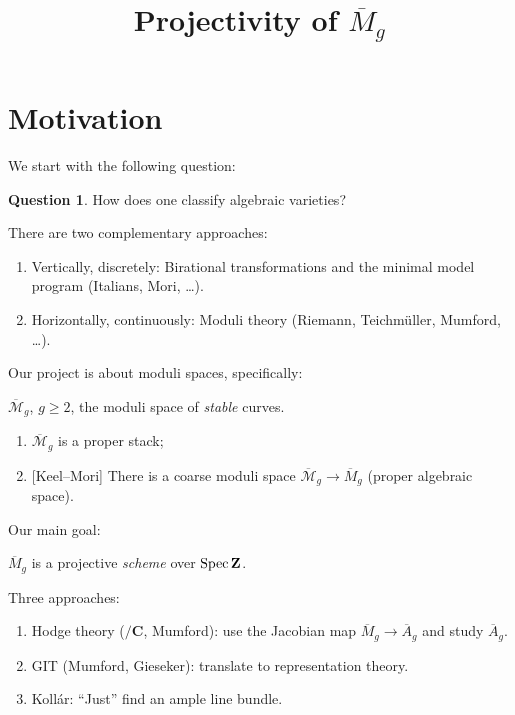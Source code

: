 
\theoremstyle{definition}
\newtheorem{question}[subsection]{Question}
\newtheorem{steps}[subsection]{Steps}

\newcommand{\todo}[1]{\footnote{\textbf{TODO.} #1}}

\title{Projectivity of $\overline{M}_g$}
\maketitle

\section{Motivation}
We start with the following question:
\begin{question}
  How does one classify algebraic varieties?
\end{question}
There are two complementary approaches:
\begin{enumerate}
  \item Vertically, discretely: Birational transformations and the minimal model
    program (Italians, Mori, \ldots).
  \item Horizontally, continuously: Moduli theory (Riemann, Teichm\"uller,
    Mumford, \ldots).
\end{enumerate}
Our project is about moduli spaces, specifically:
\begin{example}
  $\overline{\mathcal{M}}_g$, $g \ge 2$, the moduli space of \emph{stable}
  curves.
  \begin{enumerate}
    \item $\overline{\mathcal{M}}_g$ is a proper stack;
    \item{}[Keel--Mori] There is a coarse moduli space $\overline{\mathcal{M}}_g
      \to \overline{M}_g$ (proper algebraic space).
  \end{enumerate}
\end{example}
Our main goal:
\begin{theorem}
  $\overline{M}_g$ is a projective \emph{scheme} over $\mathop{\rm Spec} \mathbf{Z}$. 
\end{theorem}
Three approaches:
\begin{enumerate}
  \item Hodge theory ($/\mathbf{C}$, Mumford): use the Jacobian map
    $\overline{M}_g \to \overline{A}_g$ and study $\overline{A}_g$.
  \item GIT (Mumford, Gieseker): translate to representation theory.
  \item Koll\'ar: ``Just'' find an ample line bundle.
\end{enumerate}

